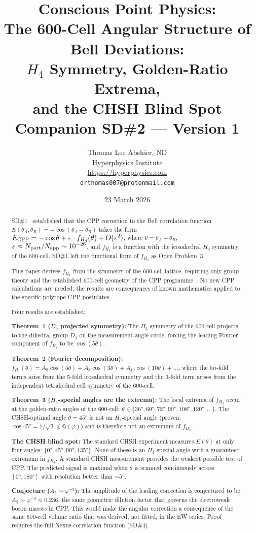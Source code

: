 \documentclass[11pt,letterpaper]{article}
\title{\textbf{Conscious Point Physics:\\
The 600-Cell Angular Structure of Bell Deviations:\\
$H_4$ Symmetry, Golden-Ratio Extrema,\\
and the CHSH Blind Spot}\\[6pt]
{\large Companion SD\#2 --- Version 1}}
\author{Thomas Lee Abshier, ND\\
Hyperphysics Institute\\
\url{https://hyperphysics.com}\\
\texttt{drthomas007@protonmail.com}}
\date{23 March 2026}
\newcommand{\phig}{\varphi}
\newcommand{\eps}{\varepsilon}
\begin{document}
\maketitle

\begin{abstract}
SD\#1~\citep{cpp_sd1} established that the CPP correction to the
Bell correlation function $E(\theta_A,\theta_B) = -\cos(\theta_A -
\theta_B)$ takes the form
$E_{\rm CPP} = -\cos\theta + \eps\cdot f_{H_4}(\theta) + O(\eps^2)$,
where $\theta = \theta_A - \theta_B$, $\eps \approx
N_{\rm part}/N_{\rm app} \sim 10^{-26}$, and $f_{H_4}$ is a function
with the icosahedral $H_4$ symmetry of the 600-cell.  SD\#1 left the
functional form of $f_{H_4}$ as Open Problem~3.

This paper derives $f_{H_4}$ from the symmetry of the 600-cell
lattice, requiring only group theory and the established 600-cell
geometry of the CPP programme~\citep{cpp_ew_unified}.  No new CPP
calculations are needed; the results are consequences of known
mathematics applied to the specific polytope CPP postulates.

Four results are established:

\textbf{Theorem~1 ($D_5$ projected symmetry):} The $H_4$ symmetry of
the 600-cell projects to the dihedral group $D_5$ on the
measurement-angle circle, forcing the leading Fourier component of
$f_{H_4}$ to be $\cos(5\theta)$.

\textbf{Theorem~2 (Fourier decomposition):}
$f_{H_4}(\theta) = A_5\cos(5\theta) + A_3\cos(3\theta) +
A_{10}\cos(10\theta) + \ldots$, where the $5n$-fold terms arise from
the 5-fold icosahedral symmetry and the 3-fold term arises from the
independent tetrahedral cell symmetry of the 600-cell.

\textbf{Theorem~3 ($H_4$-special angles are the extrema):} The local
extrema of $f_{H_4}$ occur at the golden-ratio angles of the 600-cell:
$\theta \in \{36°, 60°, 72°, 90°, 108°, 120°, \ldots\}$.
The CHSH-optimal angle $\theta = 45°$ is not an $H_4$-special angle
(proven: $\cos 45° = 1/\sqrt{2} \notin \mathbb{Q}(\phig)$) and is
therefore not an extremum of $f_{H_4}$.

\textbf{The CHSH blind spot:} The standard CHSH experiment measures
$E(\theta)$ at only four angles: $\{0°, 45°, 90°, 135°\}$.  None of
these is an $H_4$-special angle with a guaranteed extremum in
$f_{H_4}$.  A standard CHSH measurement provides the weakest possible
test of CPP.  The predicted signal is maximal when $\theta$ is scanned
continuously across $[0°, 180°]$ with resolution better than $\sim 5°$.

\textbf{Conjecture ($A_5 \sim \phig^{-3}$):} The amplitude of the
leading correction is conjectured to be $A_5 \sim \phig^{-3} \approx
0.236$, the same geometric dilution factor that governs the electroweak
boson masses in CPP.  This would make the angular correction a
consequence of the same 600-cell volume ratio that was derived, not
fitted, in the EW series.  Proof requires the full Nexus correlation
function (SD\#4).
\end{abstract}
\end{document}
